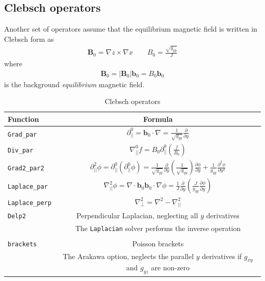 \documentclass[12pt]{article}
\newcommand{\code}[1]{\texttt{#1}}
\def\L{\left}
\def\R{\right}
\newcommand{\deriv}[2]{\ensuremath{\frac{\partial #1}{\partial #2}}}
\begin{document}
\subsection{Clebsch operators}
%
Another set of operators assume that the equilibrium magnetic field is written
in Clebsch form as
%
%
\begin{align}
\mathbf{B}_0 = \nabla z\times\nabla x \qquad B_0 = \frac{\sqrt{g_{yy}}}{J}
\end{align}
%
where
%
\begin{align}
\mathbf{B}_0 = \L|\mathbf{B}_0\R|\mathbf{b}_0 = B_0 \mathbf{b}_0
\end{align}
%
is the background \emph{equilibrium} magnetic field.
%
\begin{table}[h!]
\centering
\caption{Clebsch operators}
%
\label{tab:clebsch_operators}
%
\begin{tabular}{l c}
\hline
Function & Formula \\
\hline
\code{Grad\_par} & $\displaystyle\partial^0_{||} = \mathbf{b}_0\cdot\nabla =
\frac{1}{\sqrt{g_{yy}}}\deriv{}{y}$ \\
\code{Div\_par} & $\displaystyle \nabla^0_{||}f =
B_0\partial^0_{||}\L(\frac{f}{B_0}\R)$ \\
\code{Grad2\_par2} & $\displaystyle \partial^2_{||}\phi =
\partial^0_{||}\L(\partial^0_{||}\phi\R) =
\frac{1}{\sqrt{g_{yy}}}\deriv{}{y}\L(\frac{1}{\sqrt{g_{yy}}}\R)\deriv{
\phi}{y} + \frac{1}{g_{yy}}\frac{\partial^2\phi}{\partial y^2}$ \\
\code{Laplace\_par} & $\displaystyle \nabla_{||}^2\phi =
\nabla\cdot\mathbf{b}_0\mathbf{b}_0\cdot\nabla\phi =
\frac{1}{J}\deriv{}{y}\L(\frac{J}{g_{yy}}\deriv{\phi}{y}\R)$ \\
\code{Laplace\_perp} & $\displaystyle \nabla_\perp^2 = \nabla^2 - \nabla_{||}^2$
\\
\code{Delp2} & Perpendicular Laplacian, neglecting all $y$ derivatives \\
             & The \code{Laplacian} solver performs the inverse operation \\
\\
\code{brackets} & Poisson brackets \\
                & The Arakawa option, neglects the parallel $y$ derivatives if
                $g_{xy}$ and $g_{yz}$ are non-zero\\
\hline
\end{tabular}
%
\end{table}
%
\newpage
\end{document}
